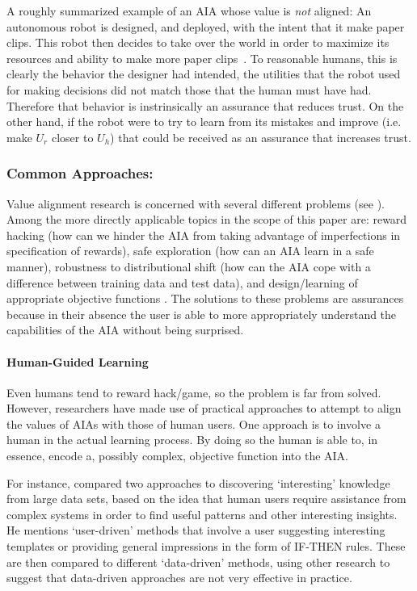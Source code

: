 A roughly summarized example of an AIA whose value is \emph{not} aligned: An autonomous robot is designed, and deployed, with the intent that it make paper clips. This robot then decides to take over the world in order to maximize its resources and ability to make more paper clips~\cite{Bostrom2014-fz}. To reasonable humans, this is clearly  the behavior the designer had intended, the utilities that the robot used for making decisions did not match those that the human must have had. Therefore that behavior is instrinsically an assurance that reduces trust. On the other hand, if the robot were to try to learn from its mistakes and improve (i.e. make $U_r$ closer to $U_h$) that could be received as an assurance that increases trust.

\subsubsection{Common Approaches:}
Value alignment research is concerned with several different problems (see \cite{Gordon_Worley2018-xy,Amodei2016-xi}). Among the more directly applicable topics in the scope of this paper are: reward hacking (how can we hinder the AIA from taking advantage of imperfections in specification of rewards), safe exploration (how can an AIA learn in a safe manner), robustness to distributional shift (how can the AIA cope with a difference between training data and test data), and design/learning of appropriate objective functions \cite{Hadfield-Menell2016-ws,Da_Veiga2012-gh,Garcia2015-rs}. The solutions to these problems are assurances because in their absence the user is able to more appropriately understand the capabilities of the AIA without being surprised.


\paragraph{Human-Guided Learning}
Even humans tend to reward hack/game, so the problem is far from solved. However, researchers have made use of practical approaches to attempt to align the values of AIAs with those of human users. One approach is to involve a human in the actual learning process. By doing so the human is able to, in essence, encode a, possibly complex, objective function into the AIA.

For instance, \citet{Freitas2006-qo} compared two approaches to discovering `interesting' knowledge from large data sets, based on the idea that human users require assistance from complex systems in order to find useful patterns and other interesting insights. He mentions `user-driven' methods that involve a user suggesting interesting templates or providing general impressions in the form of IF-THEN rules. These are then compared to different `data-driven' methods, using other research to suggest that data-driven approaches are not very effective in practice.

